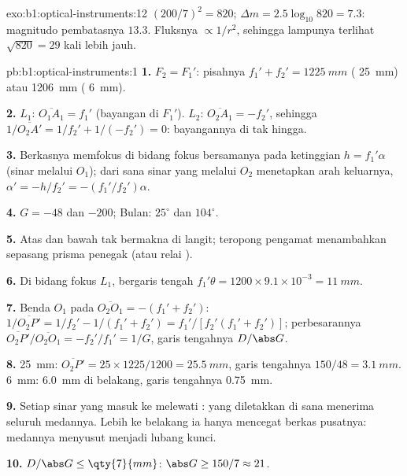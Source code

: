 \begin{solution}{exo:b1:optical-instruments:12}
$(200/7)^2 = 820$; $\Delta m = 2.5\log_{10}820 = 7.3$: magnitudo
pembatasnya $13.3$. Fluksnya $\propto 1/r^2$, sehingga lampunya terlihat
$\sqrt{820} = 29$ kali lebih jauh.
\end{solution}

\begin{solution}{pb:b1:optical-instruments:1}
\textbf{1.} $F_2 = F_1'$: pisahnya $f_1' + f_2' = \qty{1225}{mm}$
( \qty{25}{mm}) atau \qty{1206}{mm} ( \qty{6}{mm}).

\textbf{2.} $L_1$: $\overline{O_1A_1} = f_1'$ (bayangan di $F_1'$). $L_2$:
$\overline{O_2A_1} = -f_2'$, sehingga $1/\overline{O_2A'} = 1/f_2' + 1/(-f_2')
= 0$: bayangannya di tak hingga.

\textbf{3.} Berkasnya memfokus di bidang fokus bersamanya pada ketinggian $h =
f_1'\alpha$ (sinar melalui $O_1$); dari sana sinar yang melalui $O_2$
menetapkan arah keluarnya, $\alpha' = -h/f_2' = -(f_1'/f_2')\alpha$.

\textbf{4.} $G = -48$ dan $-200$; Bulan: $25^\circ$ dan $104^\circ$.

\textbf{5.} Atas dan bawah tak bermakna di langit; teropong pengamat
menambahkan sepasang prisma penegak (atau relai ).

\textbf{6.} Di bidang fokus $L_1$, bergaris tengah $f_1'\theta = 1200 \times
9.1\times10^{-3} = \qty{11}{mm}$.

\textbf{7.} Benda $O_1$ pada $\overline{O_2O_1} = -(f_1' + f_2')$:
$1/\overline{O_2P'} = 1/f_2' - 1/(f_1' + f_2') = f_1'/[f_2'(f_1' + f_2')]$;
perbesarannya $\overline{O_2P'}/\overline{O_2O_1} = -f_2'/f_1' = 1/G$,
garis tengahnya $D/\abs G$.

\textbf{8.} \qty{25}{mm}: $\overline{O_2P'} = 25 \times 1225/1200 =
\qty{25.5}{mm}$, garis tengahnya $150/48 = \qty{3.1}{mm}$. \qty{6}{mm}:
\qty{6.0}{mm} di belakang, garis tengahnya \qty{0.75}{mm}.

\textbf{9.} Setiap sinar yang masuk ke  melewati :  yang diletakkan di sana menerima seluruh medannya. Lebih
ke belakang ia hanya mencegat berkas pusatnya: medannya menyusut menjadi lubang kunci.

\textbf{10.} $D/\abs G \leq \qty{7}{mm}$: $\abs G \geq 150/7 \approx 21$.


\end{solution}
